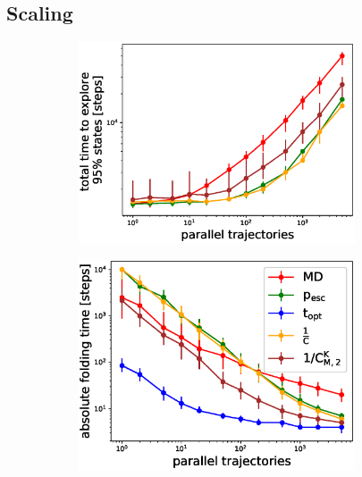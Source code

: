 \subsection{\label{sec:scaling}Scaling}

\begin{figure}[H]
  \begin{subfigure}[t]{0.5\textwidth}
    \includegraphics[width=0.9\textwidth]{figures/1FME_6_steps10000_scaling_explore_total.eps}   
  \end{subfigure}
  \begin{subfigure}[t]{0.5\textwidth}
    \includegraphics[width=0.9\textwidth]{figures/GTT_6_steps10000_scaling_fold0.eps}    
  \end{subfigure}
  \begin{subfigure}[t]{0.5\textwidth}

\end{subfigure}
\end{figure}

